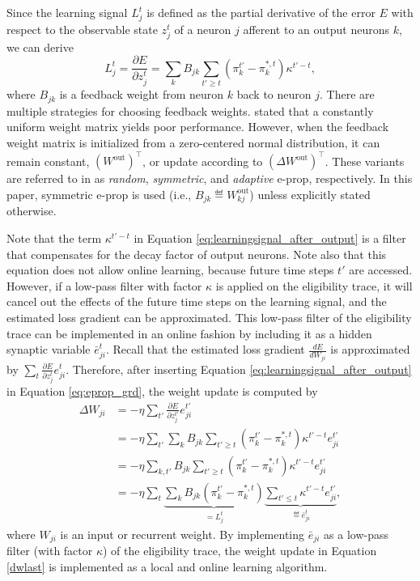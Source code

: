         Since the learning signal $L^t_j$ is defined as the partial derivative of the error $E$ with respect to the observable state $z_j^t$ of a neuron $j$ afferent to an output neurons $k$, we can derive
        \begin{equation}\label{eq:learningsignal_after_output}
        L^t_j = \frac{\partial E}{\partial z^t_j} = \sum_kB_{jk}\sum_{t'\geq t}\left(\pi^{t'}_k - \pi^{*,t}_k\right)\kappa^{t'-t},
        \end{equation}
        where $B_{jk}$ is a feedback weight from neuron $k$ back to neuron $j$.
        There are multiple strategies for choosing feedback weights.
        \cite{bellec2020solution} stated that a constantly uniform weight matrix yields poor performance.
        However, when the feedback weight matrix is initialized from a zero-centered normal distribution, it can remain constant, $(W^\text{out})^\top$, or update according to $(\Delta W^\text{out})^\top$.
        These variants are referred to in \cite{bellec2020solution} as \emph{random}, \emph{symmetric}, and \emph{adaptive} e-prop, respectively.
        In this paper, symmetric e-prop is used (i.e., $B_{jk} \eqdef W^\text{out}_{kj}$) unless explicitly stated otherwise.

        Note that the term $\kappa^{t'-t}$ in Equation \ref{eq:learningsignal_after_output} is a filter that compensates for the decay factor of output neurons.
        Note also that this equation does not allow online learning, because future time steps $t'$ are accessed.
        However, if a low-pass filter with factor $\kappa$ is applied on the eligibility trace, it will cancel out the effects of the future time steps on the learning signal, and the estimated loss gradient can be approximated.
        This low-pass filter of the eligibility trace can be implemented in an online fashion by including it as a hidden synaptic variable $\bar{e}^t_{ji}$.
        Recall that the estimated loss gradient $\frac{dE}{dW_{ji}}$ is approximated by $\sum_t \frac{\partial E}{\partial z^t_j}e^t_{ji}$.
        Therefore, after inserting Equation \ref{eq:learningsignal_after_output} in Equation \ref{eq:eprop_grd}, the weight update is computed by
        \begin{align}
        \Delta W_{ji} &= -\eta\sum_{t'}\frac{\partial E}{\partial z^{t'}_j}e^{t'}_{ji}\\
        &= -\eta\sum_{t'}\sum_kB_{jk}\sum_{t'\geq t}\left(\pi^{t'}_k - \pi^{*,t}_k\right)\kappa^{t'-t}e^{t'}_{ji}\\
        &= -\eta\sum_{k, t'}B_{jk}\sum_{t'\geq t}\left(\pi^{t'}_k - \pi^{*,t}_k\right)\kappa^{t'-t}e^{t'}_{ji}\\
        &= -\eta\sum_t\underbrace{\sum_kB_{jk}\left(\pi^{t'}_k - \pi^{*,t}_k\right)}_{=L^t_j}\underbrace{\sum_{t'\leq t}\kappa^{t'-t}e^{t'}_{ji}}_{\eqdef \bar{e}^t_{ji}}\label{dwlast},
        \end{align}
        where $W_{ji}$ is an input or recurrent weight.
        By implementing $\bar{e}_{ji}$ as a low-pass filter (with factor $\kappa$) of the eligibility trace, the weight update in Equation \ref{dwlast} is implemented as a local and online learning algorithm.

